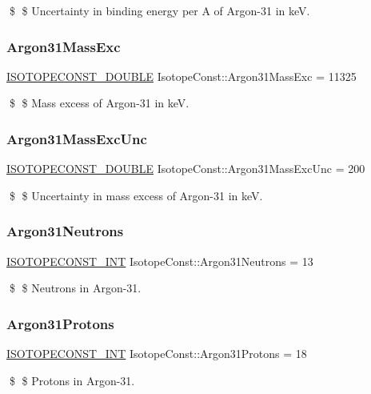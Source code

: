 \$ \$ Uncertainty in binding energy per A of Argon-\/31 in keV. \mbox{\label{group___isotope_const-_argon-_ar31_gaff0996a5eb7c4df7bcc1f13085c8c76e}} 
\subsubsection{\texorpdfstring{Argon31\+Mass\+Exc}{Argon31MassExc}}
{\footnotesize\ttfamily \mbox{\hyperlink{group___isotope_const-_macros_ga8f45a7272ce02c0b4c65c44636ed719a}{I\+S\+O\+T\+O\+P\+E\+C\+O\+N\+S\+T\+\_\+\+D\+O\+U\+B\+LE}} Isotope\+Const\+::\+Argon31\+Mass\+Exc = 11325}

\$ \$ Mass excess of Argon-\/31 in keV. \mbox{\label{group___isotope_const-_argon-_ar31_gaa9befa252b11557f2f69beb9d79f0991}} 
\subsubsection{\texorpdfstring{Argon31\+Mass\+Exc\+Unc}{Argon31MassExcUnc}}
{\footnotesize\ttfamily \mbox{\hyperlink{group___isotope_const-_macros_ga8f45a7272ce02c0b4c65c44636ed719a}{I\+S\+O\+T\+O\+P\+E\+C\+O\+N\+S\+T\+\_\+\+D\+O\+U\+B\+LE}} Isotope\+Const\+::\+Argon31\+Mass\+Exc\+Unc = 200}

\$ \$ Uncertainty in mass excess of Argon-\/31 in keV. \mbox{\label{group___isotope_const-_argon-_ar31_ga15abe4a03c9131bbd00f1d99bb021812}} 
\subsubsection{\texorpdfstring{Argon31\+Neutrons}{Argon31Neutrons}}
{\footnotesize\ttfamily \mbox{\hyperlink{group___isotope_const-_macros_ga5f18360b3e99483a35c32d789e62621c}{I\+S\+O\+T\+O\+P\+E\+C\+O\+N\+S\+T\+\_\+\+I\+NT}} Isotope\+Const\+::\+Argon31\+Neutrons = 13}

\$ \$ Neutrons in Argon-\/31. \mbox{\label{group___isotope_const-_argon-_ar31_gaf7a2370129e9ceb4b6af5e3a4a8d7a8f}} 
\subsubsection{\texorpdfstring{Argon31\+Protons}{Argon31Protons}}
{\footnotesize\ttfamily \mbox{\hyperlink{group___isotope_const-_macros_ga5f18360b3e99483a35c32d789e62621c}{I\+S\+O\+T\+O\+P\+E\+C\+O\+N\+S\+T\+\_\+\+I\+NT}} Isotope\+Const\+::\+Argon31\+Protons = 18}

\$ \$ Protons in Argon-\/31. 